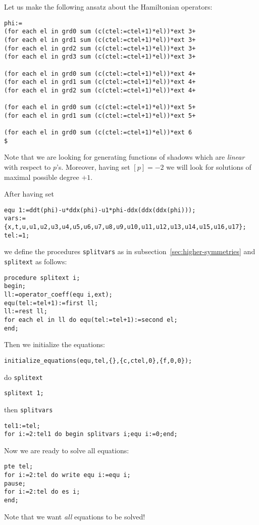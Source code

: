 Let us make the following ansatz about the Hamiltonian operators:
\begin{verbatim}
phi:=
(for each el in grd0 sum (c(ctel:=ctel+1)*el))*ext 3+
(for each el in grd1 sum (c(ctel:=ctel+1)*el))*ext 3+
(for each el in grd2 sum (c(ctel:=ctel+1)*el))*ext 3+
(for each el in grd3 sum (c(ctel:=ctel+1)*el))*ext 3+

(for each el in grd0 sum (c(ctel:=ctel+1)*el))*ext 4+
(for each el in grd1 sum (c(ctel:=ctel+1)*el))*ext 4+
(for each el in grd2 sum (c(ctel:=ctel+1)*el))*ext 4+

(for each el in grd0 sum (c(ctel:=ctel+1)*el))*ext 5+
(for each el in grd1 sum (c(ctel:=ctel+1)*el))*ext 5+

(for each el in grd0 sum (c(ctel:=ctel+1)*el))*ext 6
$
\end{verbatim}
Note that we are looking for generating functions of shadows which are
\emph{linear} with respect to $p$'s. Moreover, having set $[p]=-2$ we will look
for solutions of maximal possible degree $+1$.

After having set
\begin{verbatim}
equ 1:=ddt(phi)-u*ddx(phi)-u1*phi-ddx(ddx(ddx(phi)));
vars:={x,t,u,u1,u2,u3,u4,u5,u6,u7,u8,u9,u10,u11,u12,u13,u14,u15,u16,u17};
tel:=1;
\end{verbatim}
we define the procedures \texttt{splitvars} as in
subsection~\ref{sec:higher-symmetries} and \texttt{splitext} as follows:
\begin{verbatim}
procedure splitext i;
begin;
ll:=operator_coeff(equ i,ext);
equ(tel:=tel+1):=first ll;
ll:=rest ll;
for each el in ll do equ(tel:=tel+1):=second el;
end;
\end{verbatim}
Then we initialize the equations:
\begin{verbatim}
initialize_equations(equ,tel,{},{c,ctel,0},{f,0,0});
\end{verbatim}
do \texttt{splitext}
\begin{verbatim}
splitext 1;
\end{verbatim}
then \texttt{splitvars}
\begin{verbatim}
tel1:=tel;
for i:=2:tel1 do begin splitvars i;equ i:=0;end;
\end{verbatim}
Now we are ready to solve all equations:
\begin{verbatim}
pte tel;
for i:=2:tel do write equ i:=equ i;
pause;
for i:=2:tel do es i;
end;
\end{verbatim}
Note that we want \emph{all} equations to be solved!

